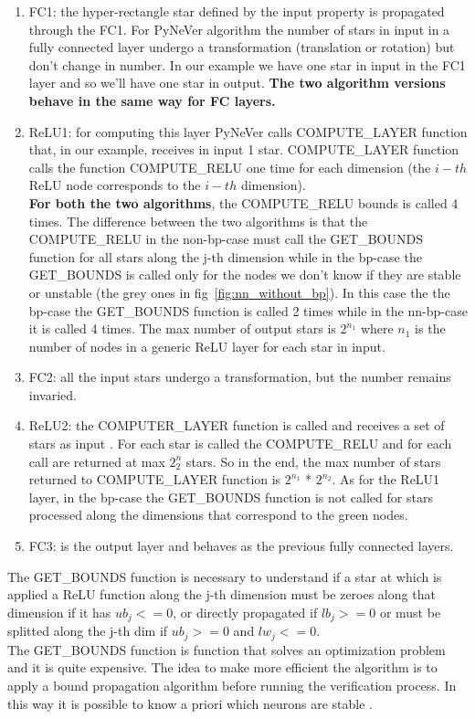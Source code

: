 \begin{enumerate}
	\item FC1: the hyper-rectangle star defined by the input property is propagated through the FC1. For PyNeVer algorithm the number of stars in input in a fully connected layer  undergo a transformation (translation or rotation) but don't change in number. In our example we have one star in input in the FC1 layer and so we'll have one star in output. \textbf{The two algorithm versions behave in the same way for FC layers.}
	\item ReLU1:  for computing this layer PyNeVer calls COMPUTE\_LAYER function that, in our example, receives in input 1 star. COMPUTE\_LAYER function calls the function COMPUTE\_RELU one time for each dimension (the $i-th$ ReLU node corresponds to the $i-th$ dimension). \\
\textbf{For both the two algorithms}, the COMPUTE\_RELU bounds is called 4 times. The difference between the two algorithms is that the COMPUTE\_RELU in the non-bp-case must call the GET\_BOUNDS function for all stars along the j-th dimension while in the bp-case the GET\_BOUNDS is called only for the nodes we don't know if they are stable or unstable (the grey ones in fig~\ref{fig:nn_without_bp}). In this case the the bp-case the GET\_BOUNDS function is called 2 times while in the nn-bp-case it is called 4 times.  The max number of output stars is $2^{n_1}$ where $n_1$ is the number of nodes in a generic ReLU layer for each star in input.
	\item FC2: all the input stars undergo a transformation, but the number remains invaried.
	\item ReLU2: the COMPUTER\_LAYER function is called and receives a set of stars as input . For each star is called the COMPUTE\_RELU and for each call are returned at max $2^n_2$ stars. So in the end, the max number of stars returned to COMPUTE\_LAYER function is $2^{n_1}$ * $2^{n_2}$. As for the ReLU1 layer, in the bp-case the GET\_BOUNDS function is not called for stars processed along the dimensions that correspond to the green nodes.
	\item FC3: is the output layer and behaves as the previous fully connected layers.
\end{enumerate}

The GET\_BOUNDS function is necessary to understand if a star at which is applied a ReLU function along the j-th dimension must be zeroes along that dimension if it has $ub_j<=0$, or directly propagated if $lb_j>=0$ or must be splitted along the j-th dim if $ub_j >=0$ and $lw_j<=0$.\\
The GET\_BOUNDS function is function that solves an optimization problem and it is quite expensive. The idea to make more efficient the algorithm is to apply a bound propagation algorithm before running the verification process. In this way it is possible to know a priori which neurons are stable .



